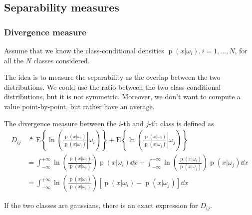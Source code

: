 \documentclass[oneside,onecolumn]{report}
\newcommand{\E}[1]{\text{E} \left\{ #1 \right\}}
\DeclareMathOperator*{\pdf}{p}
\begin{document}
\subsection{Separability measures}

\subsubsection{Divergence measure}
Assume that we know the class-conditional densities $\pdf(x | \omega_i), i = 1, \dots, N$, for all the $N$ classes considered.

The idea is to measure the separability as the overlap between the two distributions.
We could use the ratio between the two class-conditional distributions, but it is not symmetric.
Moreover, we don't want to compute a value point-by-point, but rather have an average.

The divergence measure between the $i$-th and $j$-th class is defined as
\begin{align*}
D_{i j}
&\triangleq \E{\ln( \left. \frac{\pdf(x | \omega_i)}{\pdf(x | \omega_j)} \right| \omega_i)} +
\E{\ln( \left. \frac{\pdf(x | \omega_i)}{\pdf(x | \omega_j)} \right| \omega_j)} \\
&= \int_{-\infty}^{+\infty} \ln( \frac{\pdf(x | \omega_j)}{\pdf(x | \omega_i)}) \pdf(x | \omega_i) \dd x + \int_{-\infty}^{+\infty} \ln( \frac{\pdf(x | \omega_i)}{\pdf(x | \omega_j)}) \pdf(x | \omega_j) \dd x \\
&= \int_{-\infty}^{+\infty} \ln( \frac{\pdf(x | \omega_j)}{\pdf(x | \omega_i)}) \left[ \pdf(x | \omega_i) - \pdf(x | \omega_j) \right] \dd x
\end{align*}

If the two classes are gaussians, there is an exact expression for $D_{i j}$.
\end{document}
